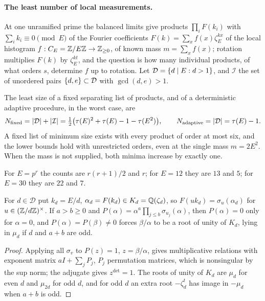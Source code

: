 \paragraph{The least number of local measurements.}
At one unramified prime the balanced limits give products $\prod_iF(k_i)$ with $\sum_ik_i\equiv0\pmod E$ of the
Fourier coefficients $F(k)=\sum_xf(x)\zeta_E^{kx}$ of the local histogram $f:C_E=\mathbb{Z}/E\mathbb{Z}\to\mathbb{Z}_{\ge0}$, of known mass
$m=\sum_xf(x)$; rotation multiplies $F(k)$ by $\zeta_E^{kt}$, and the question is how many individual products,
of what orders $s$, determine $f$ up to rotation. Let $\mathcal D=\{d\mid E:d>1\}$, and $\mathcal I$ the set of unordered
pairs $\{d,e\}\subset\mathcal D$ with $\gcd(d,e)>1$.

\begin{theorem}\label{rec:thm:probecount}
The least size of a fixed separating list of products, and of a deterministic adaptive procedure,
in the worst case, are
\[
 N_{\mathrm{fixed}}=\lvert\mathcal D\rvert+\lvert\mathcal I\rvert=\tfrac12\bigl(\tau(E)^2+\tau(E)-1-\tau(E^2)\bigr),\qquad N_{\mathrm{adaptive}}=\lvert\mathcal D\rvert=\tau(E)-1 .
\]
A fixed list of minimum size exists with every product of order at most six, and the lower bounds hold
with unrestricted orders, even at the single mass $m=2E^2$. When the mass is not supplied, both minima
increase by exactly one.
\end{theorem}

For $E=p^r$ the counts are $r(r+1)/2$ and $r$; for $E=12$ they are $13$ and $5$; for $E=30$ they are $22$
and $7$.

\begin{lemma}\label{rec:lem:probefactor}
For $d\in\mathcal D$ put $k_d=E/d$, $\alpha_d=F(k_d)\in K_d=\mathbb{Q}(\zeta_d)$, so $F(uk_d)=\sigma_u(\alpha_d)$ for
$u\in(\mathbb{Z}/d\mathbb{Z})^\times$. If $a>b\ge0$ and $P(\alpha)=\alpha^a\prod_{j\le b}\sigma_{u_j}(\alpha)$, then $P(\alpha)=0$ only for $\alpha=0$, and
$P(\alpha)=P(\beta)\ne0$ forces $\beta/\alpha$ to be a root of unity of $K_d$, lying in $\mu_d$ if $d$ and $a+b$ are odd.
\end{lemma}

\begin{proof}
Applying all $\sigma_v$ to $P(z)=1$, $z=\beta/\alpha$, gives multiplicative relations with exponent matrix
$aI+\sum_jP_j$, $P_j$ permutation matrices, which is nonsingular by the sup norm; the adjugate gives
$z^{\det}=1$. The roots of unity of $K_d$ are $\mu_d$ for even $d$ and $\mu_{2d}$ for odd $d$, and for odd $d$ an
extra root $-\zeta_d^t$ has image in $-\mu_d$ when $a+b$ is odd.
\end{proof}

